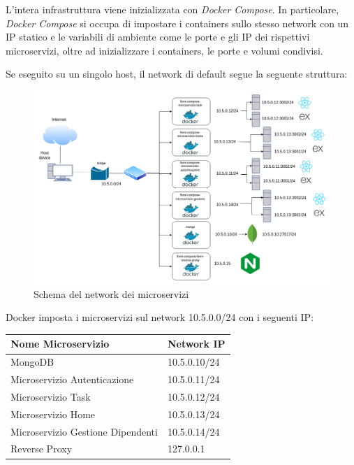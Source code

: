 \documentclass{report}
\begin{document}
L'intera infrastruttura viene inizializzata con \textit{Docker Compose}. In particolare, \textit{Docker Compose} si occupa di impostare i containers sullo stesso network con un IP statico e le variabili di ambiente come le porte e gli IP dei rispettivi microservizi, oltre ad inizializzare i containers, le porte e volumi condivisi.

Se eseguito su un singolo host, il network di default segue la seguente struttura:
\begin{figure}[H]
	\centering\includegraphics[width=1\textwidth]{images/network.png}
	Schema del network dei microservizi
\end{figure}

Docker imposta i microservizi sul network 10.5.0.0/24 con i seguenti IP:
\begin{center} %
	\centering
	\begin{tabular}{ |p{4cm}|p{4cm}|  }
		\hline
		\centering Nome Microservizio & \qquad\quad Network IP \\ %
		\hline
		MongoDB & 10.5.0.10/24 \\
		\hline
		Microservizio Autenticazione & 10.5.0.11/24 \\
		\hline
		Microservizio Task & 10.5.0.12/24 \\
		\hline
		Microservizio Home & 10.5.0.13/24 \\
		\hline
		Microservizio Gestione Dipendenti & 10.5.0.14/24 \\
		\hline
		Reverse Proxy & 127.0.0.1 \\
		\hline
	\end{tabular}
\end{center}
\end{document}
